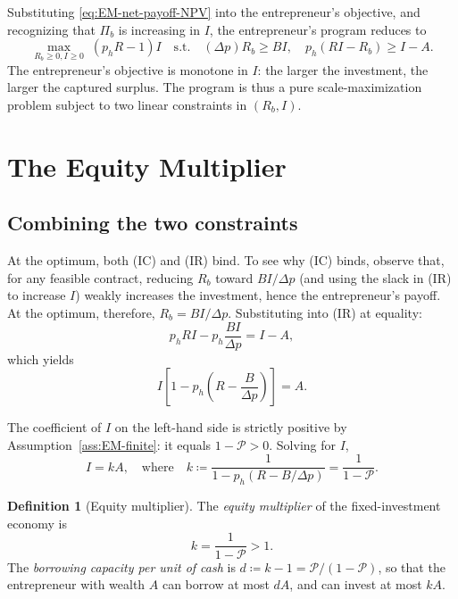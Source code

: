 \documentclass[11pt,a4paper,oneside]{book}
\def\geq{\geqslant}
\theoremstyle{plain}
\theoremstyle{definition}
\newtheorem{definition}[theorem]{Definition}
\theoremstyle{remark}
\numberwithin{equation}{chapter}
\begin{document}
Substituting \eqref{eq:EM-net-payoff-NPV} into the entrepreneur's objective, and recognizing that $\Pi_b$ is increasing in $I$, the entrepreneur's program reduces to
\begin{equation*}
  \max_{R_b \geq 0, I \geq 0} \; (p_h R - 1) I
  \quad \text{s.t.} \quad
  (\Delta p) R_b \geq B I, \quad
  p_h (R I - R_b) \geq I - A.
\end{equation*}
The entrepreneur's objective is monotone in $I$: the larger the investment, the larger the captured surplus.
The program is thus a pure scale-maximization problem subject to two linear constraints in $(R_b, I)$.

\section{The Equity Multiplier}
\label{sec:EM-multiplier}

\subsection{Combining the two constraints}

At the optimum, both (IC) and (IR) bind.
To see why (IC) binds, observe that, for any feasible contract, reducing $R_b$ toward $B I / \Delta p$ (and using the slack in (IR) to increase $I$) weakly increases the investment, hence the entrepreneur's payoff.
At the optimum, therefore, $R_b = B I / \Delta p$.
Substituting into (IR) at equality:
\begin{equation*}
  p_h R I - p_h \frac{B I}{\Delta p} = I - A,
\end{equation*}
which yields
\begin{equation}\label{eq:EM-I-A-relation}
  I \left[ 1 - p_h \left( R - \frac{B}{\Delta p} \right) \right] = A.
\end{equation}

The coefficient of $I$ on the left-hand side is strictly positive by Assumption~\ref{ass:EM-finite}: it equals $1 - \mathcal{P} > 0$.
Solving for $I$,
\begin{equation}\label{eq:EM-I-kA}
  I = k A, \quad \text{where} \quad k \coloneqq \frac{1}{1 - p_h(R - B/\Delta p)} = \frac{1}{1 - \mathcal{P}}.
\end{equation}

\begin{definition}[Equity multiplier]\label{def:EM}
The \emph{equity multiplier} of the fixed-investment economy is
\begin{equation}\label{eq:EM-k-def}
  k = \frac{1}{1 - \mathcal{P}} > 1.
\end{equation}
The \emph{borrowing capacity per unit of cash} is $d \coloneqq k - 1 = \mathcal{P}/(1 - \mathcal{P})$, so that the entrepreneur with wealth $A$ can borrow at most $d A$, and can invest at most $k A$.
\end{definition}
\end{document}
